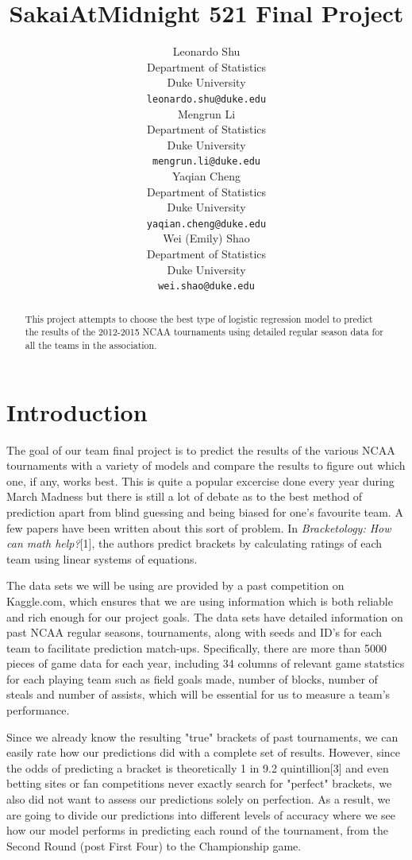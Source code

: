 \documentclass{article} %
\title{SakaiAtMidnight 521 Final Project}
\author{
  Leonardo Shu\\
  Department of Statistics\\
  Duke University\\
  \texttt{leonardo.shu@duke.edu} \\
  \And
  Mengrun Li \\
  Department of Statistics\\
  Duke University\\
  \texttt{mengrun.li@duke.edu} \\
  \AND
  Yaqian Cheng \\
  Department of Statistics\\
  Duke University\\
  \texttt{yaqian.cheng@duke.edu} \\
  \And
  Wei (Emily) Shao \\
  Department of Statistics\\
  Duke University\\
  \texttt{wei.shao@duke.edu} \\
}
\begin{document}
\maketitle

\begin{abstract}
This project attempts to choose the best type of logistic regression model to predict the results of the 2012-2015 NCAA tournaments using detailed regular season data for all the teams in the association.
\end{abstract}

\section{Introduction}

The goal of our team final project is to predict the results of the various NCAA tournaments with a variety of models and compare the results to figure out which one, if any, works best. This is quite a popular excercise done every year during March Madness but there is still a lot of debate as to the best method of prediction apart from blind guessing and being biased for one's favourite team. A few papers have been written about this sort of problem. In \textit{Bracketology: How can math help?}[1], the authors predict brackets by calculating ratings of each team using linear systems of equations.

The data sets we will be using are provided by a past competition on Kaggle.com, which ensures that we are using information which is both reliable and rich enough for our project goals. The data sets have detailed information on past NCAA regular seasons, tournaments, along with seeds and ID's for each team to facilitate prediction match-ups. Specifically, there are more than 5000 pieces of game data for each year, including 34 columns of relevant game statstics for each playing team such as field goals made, number of blocks, number of steals and number of assists, which will be essential for us to measure a team's performance.

Since we already know the resulting "true" brackets of past tournaments, we can easily rate how our predictions did with a complete set of results. However, since the odds of predicting a bracket is theoretically 1 in 9.2 quintillion[3] and even betting sites or fan competitions never exactly search for "perfect" brackets, we also did not want to assess our predictions solely on perfection. As a result, we are going to divide our predictions into different levels of accuracy where we see how our model performs in predicting each round of the tournament, from the Second Round (post First Four) to the Championship game.
\end{document}
